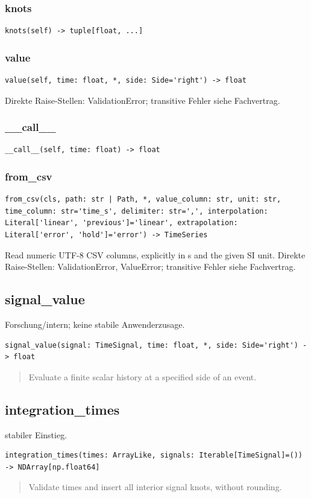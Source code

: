 \subsubsection*{knots}
\begin{lstlisting}
knots(self) -> tuple[float, ...]
\end{lstlisting}
\subsubsection*{value}
\begin{lstlisting}
value(self, time: float, *, side: Side='right') -> float
\end{lstlisting}
Direkte Raise-Stellen: ValidationError; transitive Fehler siehe Fachvertrag.
\subsubsection*{\_\_call\_\_}
\begin{lstlisting}
__call__(self, time: float) -> float
\end{lstlisting}
\subsubsection*{from\_csv}
\begin{lstlisting}
from_csv(cls, path: str | Path, *, value_column: str, unit: str, time_column: str='time_s', delimiter: str=',', interpolation: Literal['linear', 'previous']='linear', extrapolation: Literal['error', 'hold']='error') -> TimeSeries
\end{lstlisting}
Read numeric UTF-8 CSV columns, explicitly in s and the given SI unit.
Direkte Raise-Stellen: ValidationError, ValueError; transitive Fehler siehe Fachvertrag.
\subsection{signal\_value}
Forschung/intern; keine stabile Anwenderzusage.
\begin{lstlisting}
signal_value(signal: TimeSignal, time: float, *, side: Side='right') -> float
\end{lstlisting}
\begin{quote}
Evaluate a finite scalar history at a specified side of an event.
\end{quote}
\subsection{integration\_times}
stabiler Einstieg.
\begin{lstlisting}
integration_times(times: ArrayLike, signals: Iterable[TimeSignal]=()) -> NDArray[np.float64]
\end{lstlisting}
\begin{quote}
Validate times and insert all interior signal knots, without rounding.
\end{quote}
